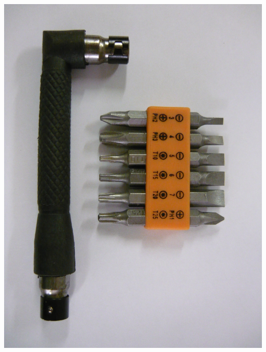 \documentclass{magazine}
\begin{document}
{\noindent\includegraphics[width=\columnwidth]{fig/00/P1020967.jpg}


}{}
\end{document}
